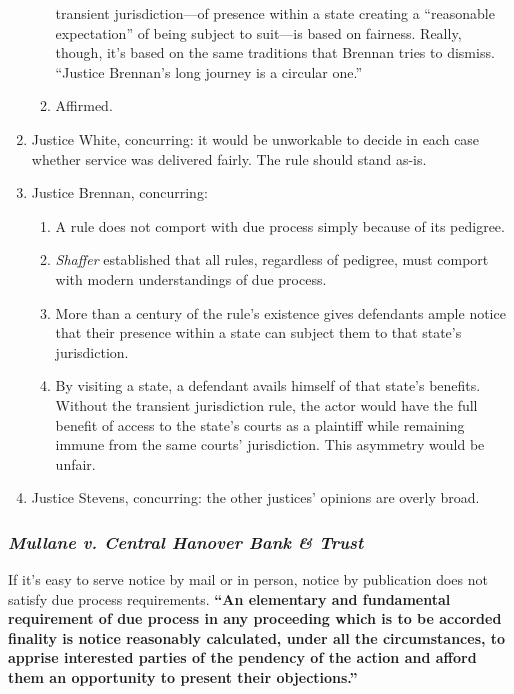 \begin{enumerate}
\begin{enumerate}
        transient jurisdiction---of presence within a state creating a 
        ``reasonable expectation'' of being subject to suit---is based on 
        fairness. Really, though, it's based on the same traditions that 
        Brennan tries to dismiss. ``Justice Brennan's long journey is a 
        circular one.''
        \item Affirmed.
    \end{enumerate}
    \item Justice White, concurring: it would be unworkable to decide in each case whether service 
        was delivered fairly. The rule should stand as-is.
    \item Justice Brennan, concurring:
    \begin{enumerate}
        \item A rule does not comport with due process simply because of its 
        pedigree.
        \item \emph{Shaffer} established that all rules, regardless of 
        pedigree, must comport with modern understandings of due process.
        \item More than a century of the rule's existence gives defendants 
        ample notice that their presence within a state can subject them to 
        that state's jurisdiction.
        \item By visiting a state, a defendant avails himself of that state's 
        benefits. Without the transient jurisdiction rule, the actor would 
        have the full benefit of access to the state's courts as a plaintiff 
        while remaining immune from the same courts' jurisdiction. This 
        asymmetry would be unfair.
    \end{enumerate}
    \item Justice Stevens, concurring: the other justices' opinions are overly broad.
\end{enumerate}

\subsubsection{\emph{Mullane v. Central Hanover Bank \& Trust}}

If it's easy to serve notice by mail or in person, notice by publication does 
not satisfy due process requirements.  \textbf{``An elementary and fundamental 
requirement of due process in any proceeding which is to be accorded finality 
is \textbf{notice reasonably calculated}, under all the circumstances, to 
apprise interested parties of the pendency of the action and afford them an 
\textbf{opportunity to present their objections}.''}

